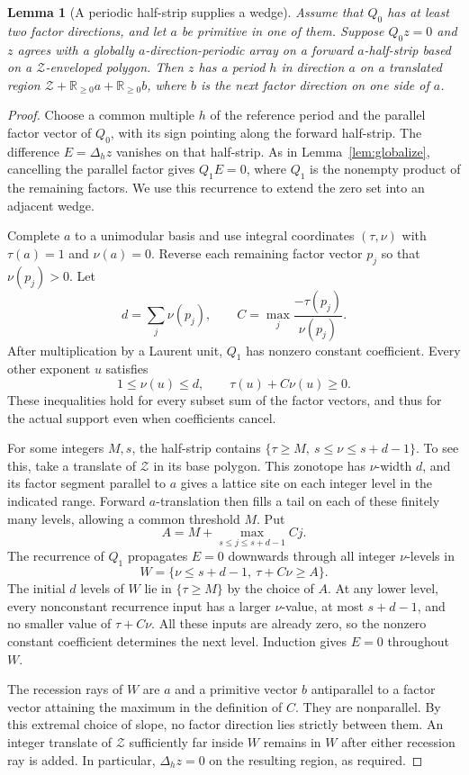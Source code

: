 \documentclass[11pt]{article}
\numberwithin{equation}{section}
\newtheorem{lemma}[theorem]{Lemma}
\theoremstyle{definition}
\theoremstyle{remark}
\newcommand{\R}{\mathbb R}
\newcommand{\Del}[1]{\Delta_{#1}}
\newcommand{\ZZ}{\mathcal Z}
\begin{document}
\begin{lemma}[A periodic half-strip supplies a wedge]\label{lem:initial-wedge}
Assume that $Q_0$ has at least two factor directions, and let $a$ be primitive in one of them.
Suppose $Q_0z=0$ and $z$ agrees with a globally $a$-direction-periodic array on a forward
$a$-half-strip based on a $\ZZ$-enveloped polygon. Then $z$ has a period $h$ in direction $a$ on a
translated region $\ZZ+\R_{\ge0}a+\R_{\ge0}b$, where $b$ is the next factor direction on one side of
$a$.
\end{lemma}
\begin{proof}
Choose a common multiple $h$ of the reference period and the parallel factor vector of $Q_0$, with
its sign pointing along the forward half-strip. The difference $E=\Del h z$ vanishes on that
half-strip. As in Lemma~\ref{lem:globalize}, cancelling the parallel factor gives $Q_1E=0$, where
$Q_1$ is the nonempty product of the remaining factors. We use this recurrence to extend the zero
set into an adjacent wedge.

Complete $a$ to a unimodular basis and use integral coordinates $(\tau,\nu)$ with $\tau(a)=1$ and
$\nu(a)=0$. Reverse each remaining factor vector $p_j$ so that $\nu(p_j)>0$. Let
\[
 d=\sum_j\nu(p_j),\qquad C=\max_j\frac{-\tau(p_j)}{\nu(p_j)}.
\]
After multiplication by a Laurent unit, $Q_1$ has nonzero constant coefficient. Every other exponent
$u$ satisfies
\[
 1\le\nu(u)\le d,\qquad \tau(u)+C\nu(u)\ge0.
\]
These inequalities hold for every subset sum of the factor vectors, and thus for the actual support
even when coefficients cancel.

For some integers $M,s$, the half-strip contains $\{\tau\ge M,\ s\le\nu\le s+d-1\}$. To see this,
take a translate of $\ZZ$ in its base polygon. This zonotope has $\nu$-width $d$, and its factor
segment parallel to $a$ gives a lattice site on each integer level in the indicated range. Forward
$a$-translation then fills a tail on each of these finitely many levels, allowing a common threshold
$M$. Put
\[
 A=M+\max_{s\le j\le s+d-1}Cj.
\]
The recurrence of $Q_1$ propagates $E=0$ downwards through all integer $\nu$-levels in
\[
 W=\{\nu\le s+d-1,\ \tau+C\nu\ge A\}.
\]
The initial $d$ levels of $W$ lie in $\{\tau\ge M\}$ by the choice of $A$. At any lower level, every
nonconstant recurrence input has a larger $\nu$-value, at most $s+d-1$, and no smaller value of
$\tau+C\nu$. All these inputs are already zero, so the nonzero constant coefficient determines the
next level. Induction gives $E=0$ throughout $W$.

The recession rays of $W$ are $a$ and a primitive vector $b$ antiparallel to a factor vector
attaining the maximum in the definition of $C$. They are nonparallel. By this extremal choice of
slope, no factor direction lies strictly between them. An integer translate of $\ZZ$ sufficiently
far inside $W$ remains in $W$ after either recession ray is added. In particular, $\Del h
z=0$ on the resulting region, as required.
\end{proof}
\end{document}
